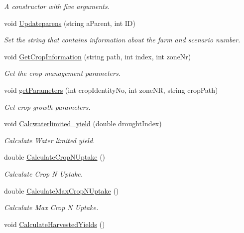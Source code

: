 \begin{DoxyCompactItemize}
\begin{DoxyCompactList}\small\item\em A constructor with five arguments. \end{DoxyCompactList}\item 
void \mbox{\hyperlink{class_crop_class_ad8101a2f08818683b8da9bc39df05fa2}{Updateparens}} (string a\+Parent, int ID)
\begin{DoxyCompactList}\small\item\em Set the string that contains information about the farm and scenario number. \end{DoxyCompactList}\item 
void \mbox{\hyperlink{class_crop_class_aace04a8772eaabd16c1cc6f2eef90188}{Get\+Crop\+Information}} (string path, int index, int zone\+Nr)
\begin{DoxyCompactList}\small\item\em Get the crop management parameters. \end{DoxyCompactList}\item 
void \mbox{\hyperlink{class_crop_class_a86ee7fdf952a189ed79abd9a13a8d917}{get\+Parameters}} (int crop\+Identity\+No, int zone\+NR, string crop\+Path)
\begin{DoxyCompactList}\small\item\em Get crop growth parameters. \end{DoxyCompactList}\item 
void \mbox{\hyperlink{class_crop_class_a5cf7e8ffac0a2f538ea86d148a2cc5cc}{Calcwaterlimited\+\_\+yield}} (double drought\+Index)
\begin{DoxyCompactList}\small\item\em Calculate Water limited yield. \end{DoxyCompactList}\item 
double \mbox{\hyperlink{class_crop_class_ab78a04a1f616bdf6f29d772fe9913f4a}{Calculate\+Crop\+N\+Uptake}} ()
\begin{DoxyCompactList}\small\item\em Calculate Crop N Uptake. \end{DoxyCompactList}\item 
double \mbox{\hyperlink{class_crop_class_a44c1e27497731c59963ea6f3dce22d6d}{Calculate\+Max\+Crop\+N\+Uptake}} ()
\begin{DoxyCompactList}\small\item\em Calculate Max Crop N Uptake. \end{DoxyCompactList}\item 
void \mbox{\hyperlink{class_crop_class_a02876da625301864f21b46da5a6f4e84}{Calculate\+Harvested\+Yields}} ()

\end{DoxyCompactItemize}
